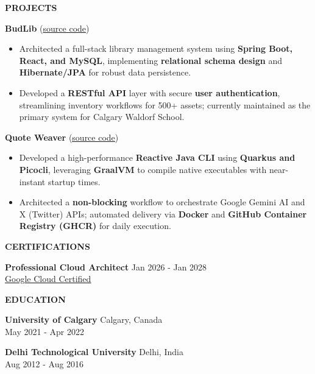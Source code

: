\documentclass[a4paper]{article}
\newcommand{\header} [1] {
    \vspace{6pt}
    {\hspace*{-18pt} \textcolor{Accent}{\large\textbf{\MakeUppercase{#1}}}}
    \vspace{-7pt} \\
    {\color{Accent}\hspace*{-18pt} \hrulefill \hspace*{-7pt}}
}
\newcommand{\resumeHeadingExperience}[4]{
    \textbf{#1} \hfill {#2}\\
    {#3} \hfill {#4}\\
    \vspace{-7pt}
}
\newcommand{\resumeItemExperience}[1]{
  \item{
    \begin{justify}
    \setlength{\rightskip}{0.15in}{{\fontsize{9.0pt}{11pt}\selectfont #1} \vspace{-2pt}}
    \end{justify}
  }
}
\newcommand{\resumeHeadingProject}[3]{
    {\textbf{#1}} (\href{#2}{\uline{source code}})
    \vspace{-5pt}
}
\newcommand{\resumeItemProject}[1]{
  \item{
    \begin{justify}
    \setlength{\rightskip}{0.15in} {{\fontsize{9.0pt}{11pt}\selectfont #1} \vspace{-4pt}}
    \end{justify}
  }
}
\newcommand{\resumeHeadingEducation}[4]{
    \textbf{#1} \hfill {#2}\\
    {\fontsize{9.0pt}{11pt}\selectfont {#3}} \hfill {#4}\\
    \vspace{5pt}
}
\begin{document}


\header{Projects}

\resumeHeadingProject {BudLib} {https://github.com/budlib} {Jan 2022 - Apr 2022}
\begin{itemize}
    \resumeItemProject {Architected a full-stack library management system using \textbf{Spring Boot, React, and MySQL}, implementing \textbf{relational schema design} and \textbf{Hibernate/JPA} for robust data persistence.}
    \resumeItemProject {Developed a \textbf{RESTful API} layer with secure \textbf{user authentication}, streamlining inventory workflows for 500+ assets; currently maintained as the primary system for Calgary Waldorf School.}
\end{itemize}

\resumeHeadingProject {Quote Weaver} {https://github.com/zbhavyai/quote-weaver} {Jul 2025 - Aug 2025}
\begin{itemize}
    \resumeItemProject {Developed a high-performance \textbf{Reactive Java CLI} using \textbf{Quarkus and Picocli}, leveraging \textbf{GraalVM} to compile native executables with near-instant startup times.}
    \resumeItemProject {Architected a \textbf{non-blocking} workflow to orchestrate Google Gemini AI and X (Twitter) APIs; automated delivery via \textbf{Docker} and \textbf{GitHub Container Registry (GHCR)} for daily execution.}
\end{itemize}
\vspace{3pt}

\header{Certifications}

\textbf{Professional Cloud Architect} \hfill Jan 2026 - Jan 2028\\
{\fontsize{9.0pt}{11pt}\selectfont \href{https://www.credly.com/badges/587b3a5f-2ba6-462d-8a33-6ebfeb5de1fd}{\uline{Google Cloud Certified}}}
\vspace{4pt}


\header{Education}

\resumeHeadingEducation {University of Calgary} {Calgary, Canada} {MEng Software Engineering} {May 2021 - Apr 2022}
\resumeHeadingEducation {Delhi Technological University} {Delhi, India} {BTech Electronics and Communication} {Aug 2012 - Aug 2016}


\end{document}
